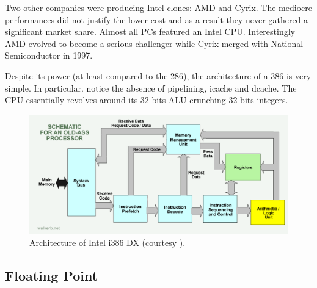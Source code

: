 \documentclass[book.tex]{subfiles}
\begin{document}
 \bigskip
 


\par

 Two other companies were producing Intel clones: AMD and Cyrix. The mediocre performances did not justify the lower cost and as a result they never gathered a significant market share. Almost all PCs featured an Intel CPU. Interestingly AMD evolved to become a serious challenger while Cyrix merged with National Semiconductor in 1997.\\
\par
Despite its power (at least compared to the 286), the architecture of a 386 is very simple. In particular. notice the absence of pipelining, icache and dcache. The CPU essentially revolves around its 32 bits ALU crunching 32-bits integers.

\begin{figure}[H]
\centering
  
      \includegraphics[width=\textwidth]{imgs/drawings/80386DX_arch.png}
\caption{Architecture of Intel i386 DX (courtesy ).}
\end{figure}








  \subsection{Floating Point}
  
\end{document}
